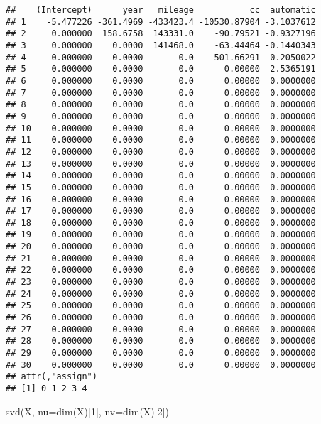 \documentclass[
]{book}
\newenvironment{Shaded}{\begin{snugshade}}{\end{snugshade}}
\newcommand{\AttributeTok}[1]{\textcolor[rgb]{0.77,0.63,0.00}{#1}}
\newcommand{\DecValTok}[1]{\textcolor[rgb]{0.00,0.00,0.81}{#1}}
\newcommand{\FunctionTok}[1]{\textcolor[rgb]{0.00,0.00,0.00}{#1}}
\newcommand{\NormalTok}[1]{#1}
\begin{document}
\begin{verbatim}
##    (Intercept)      year   mileage           cc  automatic
## 1    -5.477226 -361.4969 -433423.4 -10530.87904 -3.1037612
## 2     0.000000  158.6758  143331.0    -90.79521 -0.9327196
## 3     0.000000    0.0000  141468.0    -63.44464 -0.1440343
## 4     0.000000    0.0000       0.0   -501.66291 -0.2050022
## 5     0.000000    0.0000       0.0      0.00000  2.5365191
## 6     0.000000    0.0000       0.0      0.00000  0.0000000
## 7     0.000000    0.0000       0.0      0.00000  0.0000000
## 8     0.000000    0.0000       0.0      0.00000  0.0000000
## 9     0.000000    0.0000       0.0      0.00000  0.0000000
## 10    0.000000    0.0000       0.0      0.00000  0.0000000
## 11    0.000000    0.0000       0.0      0.00000  0.0000000
## 12    0.000000    0.0000       0.0      0.00000  0.0000000
## 13    0.000000    0.0000       0.0      0.00000  0.0000000
## 14    0.000000    0.0000       0.0      0.00000  0.0000000
## 15    0.000000    0.0000       0.0      0.00000  0.0000000
## 16    0.000000    0.0000       0.0      0.00000  0.0000000
## 17    0.000000    0.0000       0.0      0.00000  0.0000000
## 18    0.000000    0.0000       0.0      0.00000  0.0000000
## 19    0.000000    0.0000       0.0      0.00000  0.0000000
## 20    0.000000    0.0000       0.0      0.00000  0.0000000
## 21    0.000000    0.0000       0.0      0.00000  0.0000000
## 22    0.000000    0.0000       0.0      0.00000  0.0000000
## 23    0.000000    0.0000       0.0      0.00000  0.0000000
## 24    0.000000    0.0000       0.0      0.00000  0.0000000
## 25    0.000000    0.0000       0.0      0.00000  0.0000000
## 26    0.000000    0.0000       0.0      0.00000  0.0000000
## 27    0.000000    0.0000       0.0      0.00000  0.0000000
## 28    0.000000    0.0000       0.0      0.00000  0.0000000
## 29    0.000000    0.0000       0.0      0.00000  0.0000000
## 30    0.000000    0.0000       0.0      0.00000  0.0000000
## attr(,"assign")
## [1] 0 1 2 3 4
\end{verbatim}

\begin{Shaded}
\begin{Highlighting}[]
\FunctionTok{svd}\NormalTok{(X, }\AttributeTok{nu=}\FunctionTok{dim}\NormalTok{(X)[}\DecValTok{1}\NormalTok{], }\AttributeTok{nv=}\FunctionTok{dim}\NormalTok{(X)[}\DecValTok{2}\NormalTok{])}
\end{Highlighting}
\end{Shaded}
\end{document}
